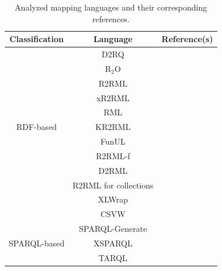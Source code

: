 \begin{table}[t]
\caption[Mapping languages overview]{Analyzed mapping languages and their corresponding references. }
\label{tab:chp2_languages_summary}
\begin{tabular}{c|c|c}
\hline
Classification                 & Language        & Reference(s) \\ \hline
\multirow{11}{*}{RDF-based}   & D2RQ            & \parencite{bizer2004d2rq,d2rq}\\ \cline{2-3} 
                              & R$_2$O          & \parencite{barrasa2004r2o}\\ \cline{2-3} 
                              & R2RML           & \parencite{das2012r2rml}\\ \cline{2-3} 
                              & xR2RML          & \parencite{michel2015xr2rml,xr2rml}\\ \cline{2-3} 
                              & RML             & \parencite{Dimou2014rml,rml}\\ \cline{2-3} 
                              & KR2RML          & \parencite{slepicka2015kr2rml}\\ \cline{2-3} 
                              & FunUL           & \parencite{junior2016funul}\\ \cline{2-3} 
                              & R2RML-f         & \parencite{debruyne2016r2rmlf}\\ \cline{2-3} 
                              & D2RML           & \parencite{chortaras2018d2rml}\\ \cline{2-3} 
                              & R2RML for collections & \parencite{debruyne2017R2RML-collections}\\ \cline{2-3}   
                              & XLWrap          & \parencite{langegger2009xlwrap,xlwrap}\\ \cline{2-3} 
                              & CSVW            & \parencite{Tennison2015csvw}\\ \hline
\multirow{4}{*}{SPARQL-based} & SPARQL-Generate &     
                              \parencite{Lefrancois2017sparqlgenerate,sparqlgenerate}\\ \cline{2-3} 
                              & XSPARQL         & \parencite{Bischof2012xsparql,xsparql}\\ \cline{2-3} 
                              & TARQL           & \parencite{tarql}\\ \cline{2-3}

\end{tabular}
\end{table}
